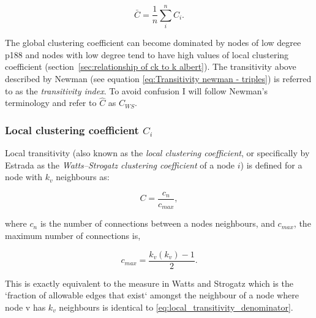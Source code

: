 \begin{equation}
    \bar{C}=\frac{1}{n}\sum_i^n C_i.
\end{equation}


The global clustering coefficient can become dominated by nodes of low degree\cite{newman2018networks} p188 and nodes with low degree tend to have high values of local clustering coefficient (section~\ref{sec:relationship of ck to k albert}). The transitivity above described by Newman\cite{newman2002random} (see equation \ref{eq:Transitivity newman - triples}) is referred to as the \textit{transitivity index}\cite{estrada2016local}. To avoid confusion I will follow Newman's \cite{newman2018networks} terminology and refer to $\hat{C}$ as $C_{WS}$.

\subsubsection{Local clustering coefficient $C_i$}
\label{sec:local clustering coefficient}
Local transitivity (also known as the \textit{local clustering coefficient}, or specifically by Estrada\cite{estrada2016local} as the \textit{Watts–Strogatz clustering coefficient} of a node $i$) is defined for a node with $k_v$ neighbours as: 

\begin{equation}
C = \frac{c_n}{c_{max}},
\end{equation}
\label{eq:local_transitvity}

where $c_n$ is the number of connections between a nodes neighbours, and $c_{max}$, the maximum number of connections is, 

\begin{equation}
c_{max} = \frac{k_v(k_v)-1}{2}.
\end{equation}
\label{eq:local_transitivity_denominator}

This \cite{newman2018networks} is exactly equivalent to the measure in Watts and Strogatz which is the `fraction of allowable edges that exist` amongst the neighbour of a node where node v has $k_v$ neighbours is identical to \ref{eq:local_transitivity_denominator}.


